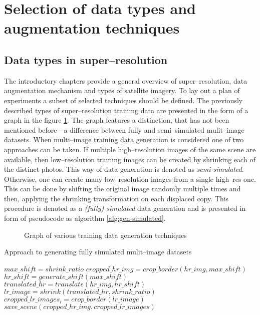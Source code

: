 \section{Selection of data types and augmentation techniques}
\subsection{Data types in super--resolution}
The introductory chapters provide a general overview of super--resolution, data augmentation mechanism and types of satellite imagery.
To lay out a plan of experiments a subset of selected techniques should be defined.
The previously described types of super--resolution training data are presented in the form of a graph in the figure \ref{fig:image-types}.
The graph features a distinction, that has not been mentioned before---a difference between fully and semi--simulated mulit--image datasets.
When multi--image training data generation is considered one of two approaches can be taken.
If multiple high--resolution images of the same scene are available, then low--resolution training images can be created by shrinking each of the distinct photos.
This way of data generation is denoted as \textit{semi simulated}.
Otherwise, one can create many low--resolution images from a single high--res one.
This can be done by shifting the original image randomly multiple times and then, applying the shrinking transformation on each displaced copy.
This procedure is denoted as a \textit{(fully) simulated} data generation and is presented in form of pseudocode as algorithm \ref{alg:gen-simulated}.
\begin{figure}
	\centering
    
    \caption{Graph of various training data generation techniques}
    \label{fig:image-types}
\end{figure}
\begin{algorithm}
\caption{Approach to generating fully simulated mulit--image datasets}
\label{alg:gen-simulated}
\begin{algorithmic}
	\STATE $ max\_shift = shrink\_ratio $
		\STATE $ cropped\_hr\_img = crop\_border(hr\_img, max\_shift) $
			\STATE $ hr\_shift = generate\_shift(max\_shift) $
			\STATE $ translated\_hr = translate(hr\_img, hr\_shift) $
			\STATE $ lr\_image = shrink(translated\_hr, shrink\_ratio) $
			\STATE $ cropped\_lr\_images_{i} = crop\_border(lr\_image) $
		\ENDFOR
		\STATE $ save\_scene(cropped\_hr\_img, cropped\_lr\_images) $
	\ENDFOR
\end{algorithmic}
\end{algorithm}

